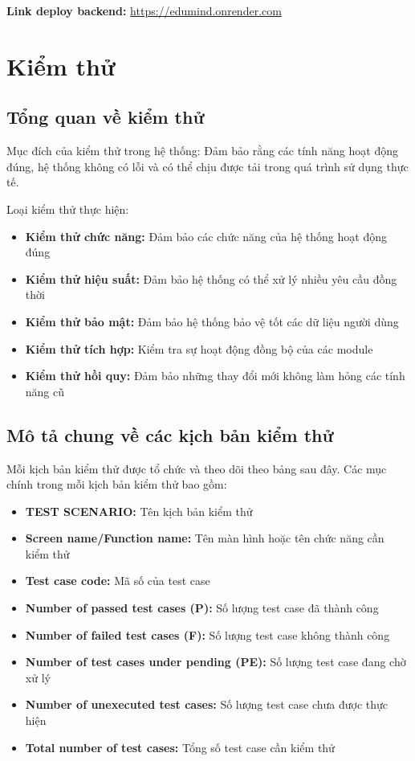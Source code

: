 \par \textbf{Link deploy backend:} \textcolor{blue}{\href{https://edumind.onrender.com}{https://edumind.onrender.com}}



\section{Kiểm thử}

\subsection{Tổng quan về kiểm thử}

Mục đích của kiểm thử trong hệ thống: Đảm bảo rằng các tính năng hoạt động đúng, hệ thống không có lỗi và có thể chịu được tải trong quá trình sử dụng thực tế.

Loại kiểm thử thực hiện:
\begin{itemize}
    \item \textbf{Kiểm thử chức năng:} Đảm bảo các chức năng của hệ thống hoạt động đúng
    \item \textbf{Kiểm thử hiệu suất:} Đảm bảo hệ thống có thể xử lý nhiều yêu cầu đồng thời
    \item \textbf{Kiểm thử bảo mật:} Đảm bảo hệ thống bảo vệ tốt các dữ liệu người dùng
    \item \textbf{Kiểm thử tích hợp:} Kiểm tra sự hoạt động đồng bộ của các module
    \item \textbf{Kiểm thử hồi quy:} Đảm bảo những thay đổi mới không làm hỏng các tính năng cũ
\end{itemize}


\subsection{Mô tả chung về các kịch bản kiểm thử}

Mỗi kịch bản kiểm thử được tổ chức và theo dõi theo bảng sau đây. Các mục chính trong mỗi kịch bản kiểm thử bao gồm:
\begin{itemize}
    \item \textbf{TEST SCENARIO:} Tên kịch bản kiểm thử
    \item \textbf{Screen name/Function name:} Tên màn hình hoặc tên chức năng cần kiểm thử
    \item \textbf{Test case code:} Mã số của test case
    \item \textbf{Number of passed test cases (P):} Số lượng test case đã thành công
    \item \textbf{Number of failed test cases (F):} Số lượng test case không thành công
    \item \textbf{Number of test cases under pending (PE):} Số lượng test case đang chờ xử lý
    \item \textbf{Number of unexecuted test cases:} Số lượng test case chưa được thực hiện
    \item \textbf{Total number of test cases:} Tổng số test case cần kiểm thử
\end{itemize}

